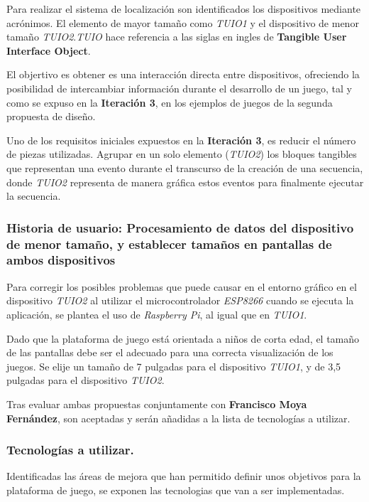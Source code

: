 Para realizar el sistema de localización son identificados los dispositivos mediante acrónimos. El elemento de mayor tamaño como \emph{TUIO1} y el dispositivo de menor tamaño \emph{TUIO2}.\emph{TUIO} hace referencia a las siglas en ingles de \textbf{Tangible User Interface Object}.

El objertivo es obtener es una interacción directa entre dispositivos, ofreciendo la posibilidad de intercambiar información durante el desarrollo de un juego, tal y como se expuso en la \textbf{Iteración 3}, en los ejemplos de juegos de la segunda propuesta de diseño.

Uno de los requisitos iniciales expuestos en la \textbf{Iteración 3}, es reducir el número de piezas utilizadas. Agrupar en un solo elemento (\emph{TUIO2}) los bloques tangibles que representan una evento durante el transcurso de la creación de una secuencia, donde \emph{TUIO2} representa de manera gráfica estos eventos para finalmente ejecutar la secuencia. 

\subsubsection{Historia de usuario: Procesamiento de datos del dispositivo de menor tamaño, y establecer tamaños en pantallas de ambos dispositivos }

Para corregir los posibles problemas que puede causar en el entorno gráfico en el dispositivo \emph{TUIO2} al utilizar el microcontrolador \emph{ESP8266} cuando se ejecuta la aplicación, se plantea el uso de \emph{Raspberry Pi}, al igual que en \emph{TUIO1}.\

Dado que la plataforma de juego está orientada a niños de corta edad, el tamaño de las pantallas debe ser el adecuado para una correcta visualización de los juegos. Se elije un tamaño de 7 pulgadas para el dispositivo \emph{TUIO1}, y de 3,5 pulgadas para el dispositivo \emph{TUIO2}.

Tras evaluar ambas propuestas conjuntamente con \textbf{Francisco Moya Fernández}, son aceptadas y serán añadidas a la lista de tecnologías a utilizar.


\subsubsection{Tecnologías a utilizar.}

Identificadas las áreas de mejora que han permitido definir unos objetivos para la plataforma de juego, se exponen las tecnologias que van a ser implementadas.\

